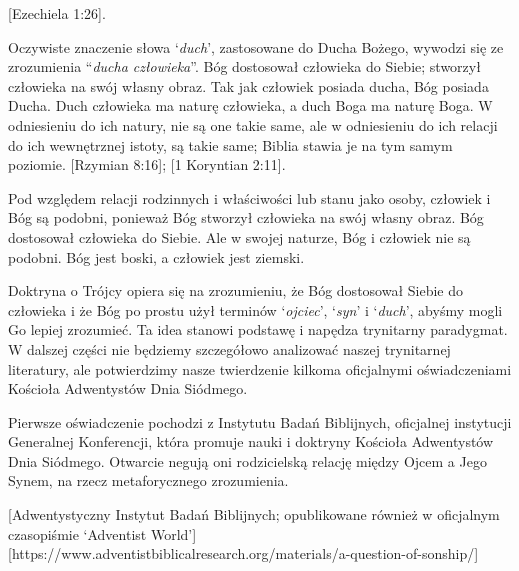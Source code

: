 [Ezechiela 1:26].

Oczywiste znaczenie słowa ‘\textit{duch}’, zastosowane do Ducha Bożego, wywodzi się ze zrozumienia “\textit{ducha człowieka}”. Bóg dostosował człowieka do Siebie; stworzył człowieka na swój własny obraz. Tak jak człowiek posiada ducha, Bóg posiada Ducha. Duch człowieka ma naturę człowieka, a duch Boga ma naturę Boga. W odniesieniu do ich natury, nie są one takie same, ale w odniesieniu do ich relacji do ich wewnętrznej istoty, są takie same; Biblia stawia je na tym samym poziomie. [Rzymian 8:16]; [1 Koryntian 2:11].

Pod względem relacji rodzinnych i właściwości lub stanu jako osoby, człowiek i Bóg są podobni, ponieważ Bóg stworzył człowieka na swój własny obraz. Bóg dostosował człowieka do Siebie. Ale w swojej naturze, Bóg i człowiek nie są podobni. Bóg jest boski, a człowiek jest ziemski.

Doktryna o Trójcy opiera się na zrozumieniu, że Bóg dostosował Siebie do człowieka i że Bóg po prostu użył terminów ‘\textit{ojciec}’, ‘\textit{syn}’ i ‘\textit{duch}’, abyśmy mogli Go lepiej zrozumieć. Ta idea stanowi podstawę i napędza trynitarny paradygmat. W dalszej części nie będziemy szczegółowo analizować naszej trynitarnej literatury, ale potwierdzimy nasze twierdzenie kilkoma oficjalnymi oświadczeniami Kościoła Adwentystów Dnia Siódmego.

Pierwsze oświadczenie pochodzi z Instytutu Badań Biblijnych, oficjalnej instytucji Generalnej Konferencji, która promuje nauki i doktryny Kościoła Adwentystów Dnia Siódmego. Otwarcie negują oni rodzicielską relację między Ojcem a Jego Synem, na rzecz metaforycznego zrozumienia.

[Adwentystyczny Instytut Badań Biblijnych; opublikowane również w oficjalnym czasopiśmie ‘Adventist World’][https://www.adventistbiblicalresearch.org/materials/a-question-of-sonship/]

